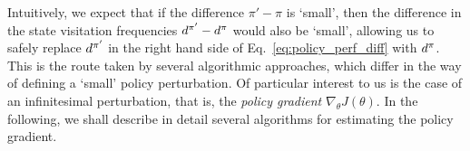Intuitively, we expect that if the difference $\pi' - \pi$ is `small', then the difference in the state visitation frequencies $d^{\pi'} - d^{\pi}$ would also be `small', allowing us to safely replace $d^{\pi'}$ in the right hand side of Eq.~\ref{eq:policy_perf_diff} with $d^{\pi}$. This is the route taken by several algorithmic approaches, which differ in the way of defining a `small' policy perturbation. Of particular interest to us is the case of an infinitesimal perturbation, that is, the \textit{policy gradient} $\nabla_{\theta} J(\theta)$. In the following, we shall describe in detail several algorithms for estimating the policy gradient.



